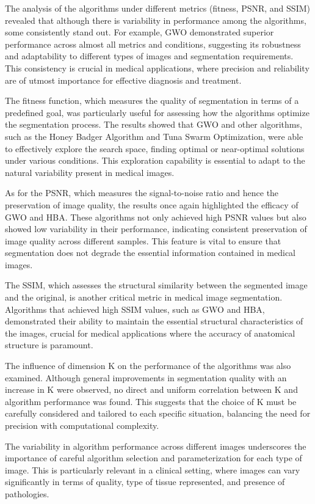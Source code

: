\documentclass{elsarticle}
\begin{document}
The analysis of the algorithms under different metrics (fitness, PSNR, and SSIM) revealed that although there is variability in performance among the algorithms, some consistently stand out. For example, GWO demonstrated superior performance across almost all metrics and conditions, suggesting its robustness and adaptability to different types of images and segmentation requirements. This consistency is crucial in medical applications, where precision and reliability are of utmost importance for effective diagnosis and treatment.

The fitness function, which measures the quality of segmentation in terms of a predefined goal, was particularly useful for assessing how the algorithms optimize the segmentation process. The results showed that GWO and other algorithms, such as the Honey Badger Algorithm and Tuna Swarm Optimization, were able to effectively explore the search space, finding optimal or near-optimal solutions under various conditions. This exploration capability is essential to adapt to the natural variability present in medical images.

As for the PSNR, which measures the signal-to-noise ratio and hence the preservation of image quality, the results once again highlighted the efficacy of GWO and HBA. These algorithms not only achieved high PSNR values but also showed low variability in their performance, indicating consistent preservation of image quality across different samples. This feature is vital to ensure that segmentation does not degrade the essential information contained in medical images.

The SSIM, which assesses the structural similarity between the segmented image and the original, is another critical metric in medical image segmentation. Algorithms that achieved high SSIM values, such as GWO and HBA, demonstrated their ability to maintain the essential structural characteristics of the images, crucial for medical applications where the accuracy of anatomical structure is paramount.

The influence of dimension K on the performance of the algorithms was also examined. Although general improvements in segmentation quality with an increase in K were observed, no direct and uniform correlation between K and algorithm performance was found. This suggests that the choice of K must be carefully considered and tailored to each specific situation, balancing the need for precision with computational complexity.

The variability in algorithm performance across different images underscores the importance of careful algorithm selection and parameterization for each type of image. This is particularly relevant in a clinical setting, where images can vary significantly in terms of quality, type of tissue represented, and presence of pathologies.
\end{document}

